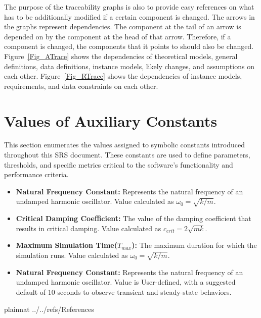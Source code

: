 \documentclass[12pt]{article}
\begin{document}
The purpose of the traceability graphs is also to provide easy references on
what has to be additionally modified if a certain component is changed.  The
arrows in the graphs represent dependencies. The component at the tail of an
arrow is depended on by the component at the head of that arrow. Therefore, if a
component is changed, the components that it points to should also be
changed. Figure~\ref{Fig_ATrace} shows the dependencies of theoretical models,
general definitions, data definitions, instance models, likely changes, and
assumptions on each other. Figure~\ref{Fig_RTrace} shows the dependencies of
instance models, requirements, and data constraints on each other.



\newpage

\section{Values of Auxiliary Constants}

This section enumerates the values assigned to symbolic constants introduced 
throughout this SRS document. These constants are used to define parameters, 
thresholds, and specific metrics critical to the software's functionality and 
performance criteria.

\begin{itemize}
  \item \textbf{Natural Frequency Constant:} Represents the natural frequency 
  of an undamped harmonic oscillator. Value calculated as $\omega_{0}=\sqrt{k/m}$.

  \item \textbf{Critical Damping Coefficient:} The value of the damping 
  coefficient that results in critical damping. Value calculated as 
  $c_{crit}=2\sqrt{mk}$.

  \item \textbf{Maximum Simulation Time($T_{max}$):} The maximum duration for which the 
  simulation runs. Value calculated as $\omega_{0}=\sqrt{k/m}$.

  \item \textbf{Natural Frequency Constant:} Represents the natural frequency 
  of an undamped harmonic oscillator. Value is User-defined, with a suggested 
  default of 10 seconds to observe transient and steady-state behaviors.
  
\end{itemize}

\newpage

 {plainnat}
 {../../refs/References}
\end{document}
